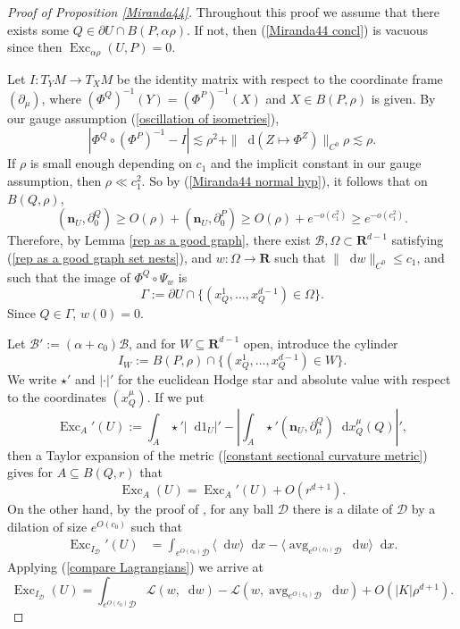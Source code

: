 \documentclass[reqno,11pt]{amsart}
\newcommand{\RR}{\mathbf{R}}
\DeclareMathOperator{\avg}{avg}
\DeclareMathOperator{\Exc}{Exc}
\newcommand*\dif{\mathop{}\!\mathrm{d}}
\newcommand{\Lagrange}{\mathscr L}
\newcommand{\normal}{\mathbf n}
\theoremstyle{definition}
\numberwithin{equation}{section}
\begin{document}
\begin{proof}[Proof of Proposition \ref{Miranda44}]
Throughout this proof we assume that there exists some $Q \in \partial U \cap B(P, \alpha \rho)$.
If not, then (\ref{Miranda44 concl}) is vacuous since then $\Exc_{\alpha \rho} (U, P) = 0$.

Let $I: T_YM \to T_XM$ be the identity matrix with respect to the coordinate frame $(\partial_\mu)$, where $(\Phi^Q)^{-1}(Y) = (\Phi^P)^{-1}(X)$ and $X \in B(P, \rho)$ is given.
By our gauge assumption (\ref{oscillation of isometries}),
$$|\Phi^Q \circ (\Phi^P)^{-1} - I| \lesssim \rho^2 + \|\dif(Z \mapsto \Phi^Z)\|_{C^0} \rho \lesssim \rho.$$
If $\rho$ is small enough depending on $c_1$ and the implicit constant in our gauge assumption, then $\rho \ll c_1^2$.
So by (\ref{Miranda44 normal hyp}), it follows that on $B(Q, \rho)$,
$$(\normal_U, \partial^Q_0) \geq O(\rho) + (\normal_U, \partial^P_0) \geq O(\rho) + e^{-o(c_1^2)} \geq e^{-o(c_1^2)}.$$
Therefore, by Lemma \ref{rep as a good graph},
there exist $\mathscr B, \Omega \subset \RR^{d - 1}$ satisfying (\ref{rep as a good graph set nests}), and $w: \Omega \to \RR$ such that $\|\dif w\|_{C^0} \leq c_1$, and such that the image of $\Phi^Q \circ \Psi_w$ is
$$\Gamma := \partial U \cap \{(x_Q^1, \dots, x_Q^{d - 1}) \in \Omega\}.$$
Since $Q \in \Gamma$, $w(0) = 0$.

Let $\mathscr B' := (\alpha + c_0) \mathscr B$, and for $W \subseteq \RR^{d - 1}$ open, introduce the cylinder
$$I_W := B(P, \rho) \cap \{(x^1_Q, \dots, x^{d - 1}_Q) \in W\}.$$
We write $\star'$ and $|\cdot|'$ for the euclidean Hodge star and absolute value with respect to the coordinates $(x^\mu_Q)$.
If we put
$$\Exc_A'(U) := \int_A \star' |\dif 1_U|' - \left|\int_A \star' (\normal_U, \partial^Q_\mu) \dif x^\mu_Q(Q)\right|',$$
then a Taylor expansion of the metric (\ref{constant sectional curvature metric}) gives for $A \subseteq B(Q, r)$ that
$$\Exc_A(U) = \Exc_A'(U) + O(r^{d + 1}).$$
On the other hand, by the proof of \cite[Lemma 6.4]{Giusti77}, for any ball $\mathscr D$ there is a dilate of $\mathscr D$ by a dilation of size $e^{O(c_0)}$ such that
\begin{align*}
\Exc_{I_{\mathscr D}}'(U) &= \int_{e^{O(c_0)} \mathscr D} \langle \dif w\rangle \dif x - \langle \avg_{e^{O(c_0)} \mathscr D} \dif w\rangle \dif x.
\end{align*}
Applying (\ref{compare Lagrangians}) we arrive at
\begin{equation}\label{excess versus lagrangian}
\Exc_{I_{\mathscr D}}(U) = \int_{e^{O(c_0)} \mathscr D} \Lagrange(w, \dif w) - \Lagrange(w, \avg_{e^{O(c_0)} \mathscr D} \dif w) + O(|K| \rho^{d + 1}).
\end{equation}


\end{proof}
\end{document}
